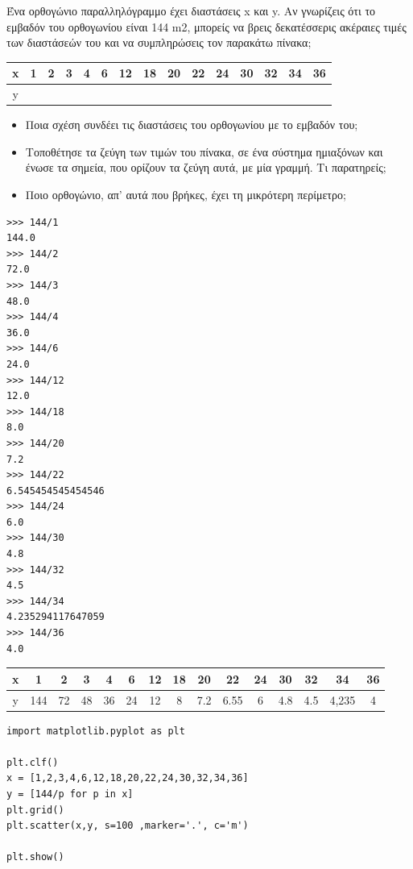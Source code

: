 \begin{exercise}

Ένα ορθογώνιο παραλληλόγραμμο έχει διαστάσεις x και y. Aν γνωρίζεις ότι το εμβαδόν του ορθογωνίου είναι 144 m2, μπορείς να βρεις δεκατέσσερις ακέραιες τιμές των διαστάσεών του και να συμπληρώσεις τον παρακάτω πίνακα;
\begin{table}
\begin{tabular}{|c|c|c|c|c|c|c|c|c|c|c|c|c|c|c|}\hline
x & 1 & 2 & 3 &  4 & 6 & 12 & 18 & 20 & 22 & 24 & 30 &  32 & 34 & 36 \\\hline
y & & & & & & & & & & & & & &  \\\hline
\end{tabular}
\end{table}
\begin{itemize}
\item  Ποια σχέση συνδέει τις διαστάσεις του ορθογωνίου με το εμβαδόν του;
\item Τοποθέτησε τα ζεύγη των τιμών του πίνακα, σε ένα σύστημα ημιαξόνων και  ένωσε τα σημεία, που ορίζουν τα ζεύγη αυτά, με μία γραμμή. Τι παρατηρείς;
\item Ποιο ορθογώνιο, απ’ αυτά που βρήκες, έχει τη μικρότερη περίμετρο;
\end{itemize}
\end{exercise}
\begin{lstlisting}
>>> 144/1
144.0
>>> 144/2
72.0
>>> 144/3
48.0
>>> 144/4
36.0
>>> 144/6
24.0
>>> 144/12
12.0
>>> 144/18
8.0
>>> 144/20
7.2
>>> 144/22
6.545454545454546
>>> 144/24
6.0
>>> 144/30
4.8
>>> 144/32
4.5
>>> 144/34
4.235294117647059
>>> 144/36
4.0
\end{lstlisting}
\begin{table}
\begin{tabular}{|c|c|c|c|c|c|c|c|c|c|c|c|c|c|c|}\hline
x & 1 & 2 & 3 &  4 & 6 & 12 & 18 & 20 & 22 & 24 & 30 &  32 & 34 & 36 \\\hline
y &144&72&48&36&24&12&8&7.2&6.55&6&4.8&4.5&4,235&4 \\\hline
\end{tabular}
\end{table}

\begin{lstlisting}
import matplotlib.pyplot as plt

plt.clf()
x = [1,2,3,4,6,12,18,20,22,24,30,32,34,36]
y = [144/p for p in x]
plt.grid()
plt.scatter(x,y, s=100 ,marker='.', c='m')

plt.show()
\end{lstlisting}

